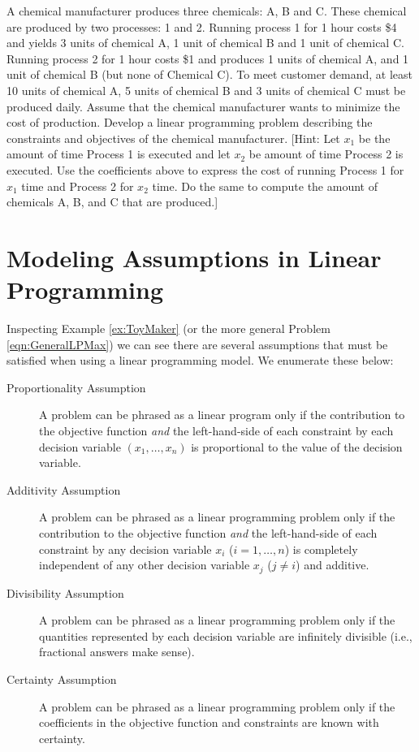 \begin{exercise} A chemical manufacturer produces three chemicals: A, B and C. These chemical are produced by two processes: 1 and 2. Running process 1 for 1 hour costs \$4 and yields 3 units of chemical A, 1 unit of chemical B and 1 unit of chemical C. Running process 2 for 1 hour costs \$1 and produces 1 units of chemical A, and 1 unit of chemical B (but none of Chemical C). To meet customer demand, at least 10 units of chemical A, 5 units of chemical B and 3 units of chemical C must be produced daily. Assume that the chemical manufacturer wants to minimize the cost of production. Develop a linear programming problem describing the constraints and objectives of the chemical manufacturer. [Hint: Let $x_1$ be the amount of time Process 1 is executed and let $x_2$ be amount of time Process 2 is executed. Use the coefficients above to express the cost of running Process 1 for $x_1$ time and Process 2 for $x_2$ time. Do the same to compute the amount of chemicals A, B, and C that are produced.]
\label{exer:ChemicalPlant}
\end{exercise}

\section{Modeling Assumptions in Linear Programming}
Inspecting Example \ref{ex:ToyMaker} (or the more general Problem \ref{eqn:GeneralLPMax}) we can see there are several assumptions that must be satisfied when using a linear programming model. We enumerate these below:
\begin{description}
\item[Proportionality Assumption] A problem can be phrased as a linear program only if the contribution to the objective function \textit{and} the left-hand-side of each constraint by each decision variable $(x_1,\dots,x_n)$ is proportional to the value of the decision variable.

\item[Additivity Assumption] A problem can be phrased as a linear programming problem only if the contribution to the objective function \textit{and} the left-hand-side of each constraint by any decision variable $x_i$ ($i=1,\dots,n$) is completely independent of any other decision variable $x_j$ ($j \neq i$) and additive. 

\item[Divisibility Assumption] A problem can be phrased as a linear programming problem only if the quantities represented by each decision variable are infinitely divisible (i.e., fractional answers make sense). 

\item[Certainty Assumption] A problem can be phrased as a linear programming problem only if the coefficients in the objective function and constraints are known with certainty. 
\end{description}

